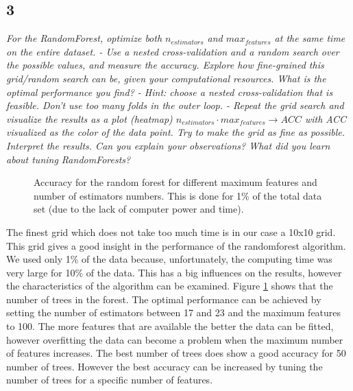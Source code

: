 \documentclass[a4paper,12pt]{article}
\begin{document}
{\subsection*{3}
{\it For the RandomForest, optimize both $n_{estimators}$ and $max_{features}$ at the same time on the entire dataset. - Use a nested cross-validation and a random search over the possible values, and measure the accuracy. Explore how fine-grained this grid/random search can be, given your computational resources. What is the optimal performance you find? - Hint: choose a nested cross-validation that is feasible. Don’t use too many folds in the outer loop. - Repeat the grid search and visualize the results as a plot (heatmap) $n_{estimators}\cdot max_{features} \rightarrow ACC$ with ACC visualized as the color of the data point. Try to make the grid as fine as possible. Interpret the results. Can you explain your observations? What did you learn about tuning RandomForests?}
\begin{figure}[H]
\hfill
{}
\hfill
\caption{Accuracy for the random forest for different maximum features and number of estimators numbers. This is done for 1\% of the total data set (due to the lack of computer power and time).}
\label{Q23}
\end{figure}
\textnormal{The finest grid which does not take too much time is in our case a 10x10 grid. This grid gives a good insight in the performance of the randomforest algorithm. We used only 1\% of the data because, unfortunately, the computing time was very large for 10\% of the data. This has a big influences on the results, however the characteristics of the algorithm can be examined. Figure \ref{Q23} shows that the number of trees in the forest. The optimal performance can be achieved by setting the number of estimators between 17 and 23 and the maximum features to 100. The more features that are available the better the data can be fitted, however overfitting the data can become a problem when the maximum number of features increases. The best number of trees does show a good accuracy for 50 number of trees. However the best accuracy can be increased by tuning the number of trees for a specific number of features.} 

}
\end{document}
